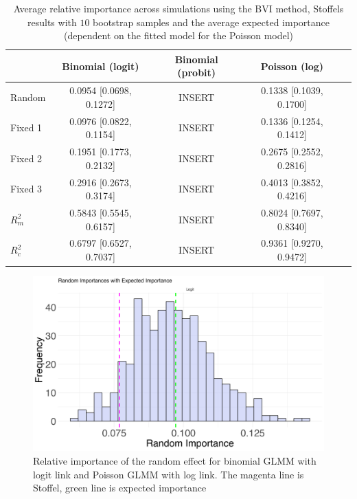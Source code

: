\begin{table}[ht]
  \centering
  \begin{tabular}{lcccc}
  \hline
   & Binomial (logit) & Binomial (probit) & Poisson (log) \\ \hline
  Random & 0.0954 [0.0698, 0.1272] & INSERT & 0.1338 [0.1039, 0.1700] \\
  Fixed 1 & 0.0976 [0.0822, 0.1154] & INSERT & 0.1336 [0.1254, 0.1412] \\
  Fixed 2 & 0.1951 [0.1773, 0.2132] & INSERT & 0.2675 [0.2552, 0.2816] \\
  Fixed 3 & 0.2916 [0.2673, 0.3174] & INSERT & 0.4013 [0.3852, 0.4216] \\ 
  $R^2_m$ & 0.5843 [0.5545, 0.6157] & INSERT & 0.8024 [0.7697, 0.8340] \\ 
  $R^2_c$ & 0.6797 [0.6527, 0.7037] & INSERT & 0.9361 [0.9270, 0.9472] \\ \hline
  \end{tabular}
  \caption{Average relative importance across simulations using the BVI method, Stoffels results with $10$ bootstrap samples and the average expected importance (dependent on the fitted model for the Poisson model)}
  \label{tab:summary_findings}
\end{table}







\begin{figure}[H]
  \centering
    \includegraphics[width=0.7\linewidth]{Figures/Simulation study/Random_logit.png}
    \caption{Relative importance of the random effect for binomial GLMM with logit link and Poisson GLMM with log link. The magenta line is Stoffel, green line is expected importance}
    \label{fig:relimp_random_logit}
\end{figure}


